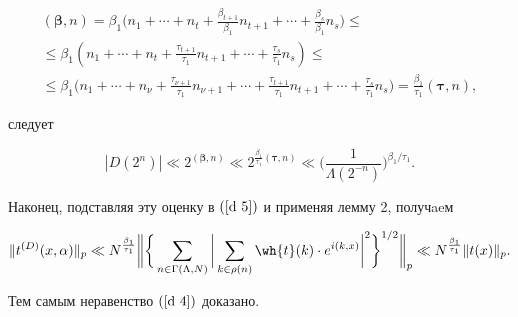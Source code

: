 \begin{pf}
\begin{multline*}
({\boldsymbol{\beta}},n)=\beta_1 \bigg(n_1+\dotsb+n_t+


{\frac{\beta_{t+1}}{\beta_1}} n_{t+1}+\dotsb+{\frac{\beta_{s}}{\beta_1}} 


n_{s} \bigg)\leq \\


%


\leq \beta_1 \left(n_1+\dotsb+n_t+{\frac{\tau_{t+1}}{\tau_1}}n_{t+1}+\dotsb+


\frac{\tau_s}{\tau_1} n_s \right) \leq \\


%


\le \beta_1 \bigg(n_1+\dotsb 


+n_{\nu}+{\frac{\tau_{\nu+1}}{\tau_1}} n_{\nu+1}+\dotsb+{\frac{\tau_{t+1}}


{\tau_1}} n_{t+1}+\cdots+{\frac{\tau_{s}}{\tau_1}} n_s \bigg)=


{\frac{\beta_1}{\tau_1}} ({\boldsymbol{\tau}}, n) , 


\end{multline*}


следует


$$


|D(2^n)| \ll 2^{({\boldsymbol{\beta}},n)}\ll 2^


{\frac{\beta_1}{\tau_1}({\boldsymbol{\tau}}, n)} \ll \bigg(\frac{1}


{\Lambda(2^{- n})}\bigg)^{\beta_1/\tau_1}.


$$


Наконец, подставляя эту оценку в $(\ref{d 5})$ и применяя лемму 2, получaeм


$$


\|t^{(D)}( x, \alpha)\|_p \ll


N^{\frac{\beta_1}{\tau_1}} \bigg\|\bigg\{ \sum_{n\in \Gamma


(\Lambda,N)}\bigg |\sum_{k\in \rho (n)} \wh{t}(k)


\cdot e^{i(k, x)}\bigg |^{ 2} \bigg \}^ {1/2}\bigg\|_p \ll 


N^{\frac{\beta_1}{\tau_1}} {\| t(x)\|_p} .


$$


Тем самым неравенство $(\ref {d 4})$ доказано.


\end{pf}





